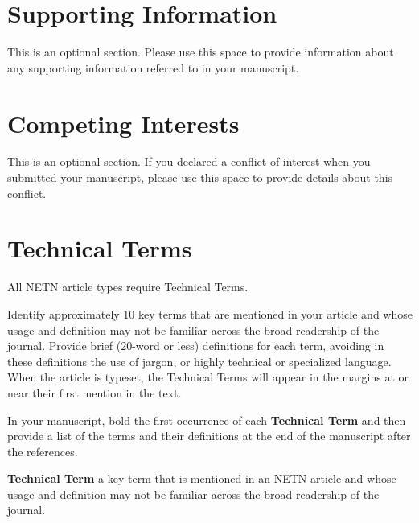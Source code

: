 \documentclass[NETN,manuscript]{stjour-new}
\begin{document}
\section{Supporting Information}
This is an optional section. Please use this space to provide information about any supporting information referred to in your manuscript.

\section{Competing Interests}
This is an optional section. If you declared a conflict of interest when you submitted your manuscript, please  use this space to provide details about this conflict.




\section{Technical Terms}

All NETN article types require Technical Terms.

Identify approximately 10 key terms that are mentioned in your article and whose usage and definition may not be familiar across the broad readership of the journal. 
Provide brief (20-word or less) definitions for each term, avoiding in these definitions the use of jargon, or highly technical or specialized language. 
When the article is typeset, the Technical Terms will appear in the margins at or near their first mention in the text.

In your manuscript, bold the first occurrence of each \textbf{Technical Term} and then provide a list of the terms and their definitions at the end of the manuscript after the references. 

\textbf{Technical Term} a key term that is mentioned in an NETN article and whose usage and definition may not be familiar across the broad readership of the journal. 
\end{document}
